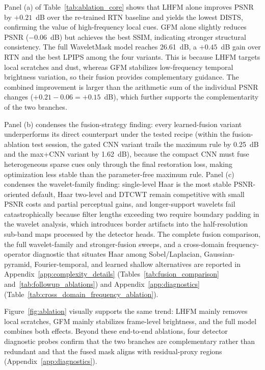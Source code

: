 {Panel (a) of Table~\ref{tab:ablation_core} shows that LHFM alone improves PSNR by $+0.21$~dB over the re-trained RTN baseline and yields the lowest DISTS, confirming the value of high-frequency local cues. GFM alone slightly reduces PSNR ($-0.06$~dB) but achieves the best SSIM, indicating stronger structural consistency. The full WaveletMask model reaches 26.61~dB, a $+0.45$~dB gain over RTN and the best LPIPS among the four variants. This is because LHFM targets local scratches and dust, whereas GFM stabilizes low-frequency temporal brightness variation, so their fusion provides complementary guidance. The combined improvement is larger than the arithmetic sum of the individual PSNR changes ($+0.21-0.06=+0.15$~dB), which further supports the complementarity of the two branches.

Panel (b) condenses the fusion-strategy finding: every learned-fusion variant underperforms its direct counterpart under the tested recipe (within the fusion-ablation test session, the gated CNN variant trails the maximum rule by 0.25~dB and the max+CNN variant by 1.62~dB), because the compact CNN must fuse heterogeneous sparse cues only through the final restoration loss, making optimization less stable than the parameter-free maximum rule. Panel (c) condenses the wavelet-family finding: single-level Haar is the most stable PSNR-oriented default, Haar two-level and DTCWT remain competitive with small PSNR costs and partial perceptual gains, and longer-support wavelets fail catastrophically because filter lengths exceeding two require boundary padding in the wavelet analysis, which introduces border artifacts into the half-resolution sub-band maps processed by the detector heads. The complete fusion comparison, the full wavelet-family and stronger-fusion sweeps, and a cross-domain frequency-operator diagnostic that situates Haar among Sobel/Laplacian, Gaussian-pyramid, Fourier-temporal, and learned shallow alternatives are reported in Appendix~\ref{app:complexity_details} (Tables~\ref{tab:fusion_comparison} and~\ref{tab:followup_ablations}) and Appendix~\ref{app:diagnostics} (Table~\ref{tab:cross_domain_frequency_ablation}).

Figure~\ref{fig:ablation} visually supports the same trend: LHFM mainly removes local scratches, GFM mainly stabilizes frame-level brightness, and the full model combines both effects. Beyond these end-to-end ablations, four detector diagnostic probes confirm that the two branches are complementary rather than redundant and that the fused mask aligns with residual-proxy regions (Appendix~\ref{app:diagnostics}).

}
